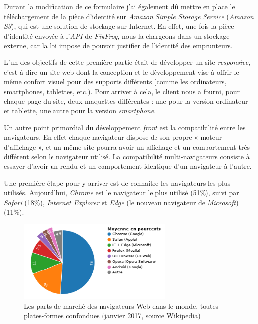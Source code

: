 \documentclass[12pt,a4paper]{article}
\begin{document}
  \bigskip

  Durant la modification de ce formulaire j'ai également dû mettre en
  place le téléchargement de la pièce d'identité sur \emph{Amazon Simple
  Storage Service} (\emph{Amazon S3}), qui est une solution de stockage
  sur Internet. En effet, une fois la pièce d'identité envoyée à
  l'\emph{API} de \emph{FinFrog}, nous la chargeons dans un stockage
  externe, car la loi impose de pouvoir justifier de l'identité des
  emprunteurs.

  \bigskip

  L'un des objectifs de cette première partie était de développer un site
  \emph{responsive}, c'est à dire un site web dont la conception et le
  développement vise à offrir le même confort visuel pour des supports
  différents (comme les ordinateurs, smartphones, tablettes, etc.). Pour
  arriver à cela, le client nous a fourni, pour chaque page du site, deux
  maquettes différentes : une pour la version ordinateur et tablette, une
  autre pour la version \emph{smartphone}.

  \bigskip

  Un autre point primordial du développement \emph{front} est la
  compatibilité entre les navigateurs. En effet chaque navigateur dispose
  de son propre « moteur d'affichage », et un même site pourra avoir un
  affichage et un comportement très différent selon le navigateur utilisé.
  La compatibilité multi-navigateurs consiste à essayer d'avoir un rendu
  et un comportement identique d'un navigateur à l'autre.

  \bigskip

  Une première étape pour y arriver est de connaitre les navigateurs les
  plus utilisés. Aujourd'hui, \emph{Chrome} est le navigateur le plus
  utilisé (51\%), suivi par \emph{Safari} (18\%), \emph{Internet Explorer}
  et \emph{Edge} (le nouveau navigateur de \emph{Microsoft}) (11\%).

  \begin{figure}[h]
    \centering
    \includegraphics[height=4cm]{figures/browsers.png}
    \caption{Les parts de marché des navigateurs Web dans le monde, toutes plates-formes confondues (janvier 2017, source Wikipedia)}
  \end{figure}
\end{document}
